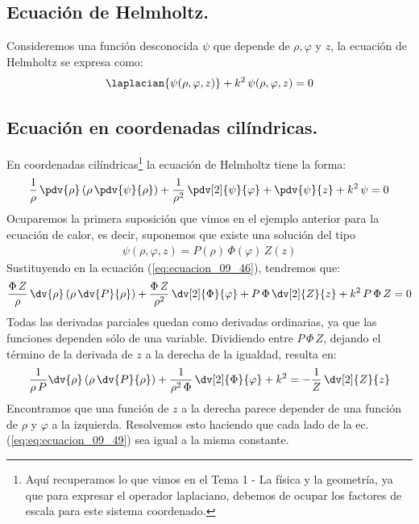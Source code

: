 \subsection{Ecuación de Helmholtz.}
Consideremos una función desconocida $\psi$ que depende de $\rho, \varphi$ y $z$, la ecuación de Helmholtz se expresa como:
\begin{align}
\laplacian{\psi (\rho, \varphi, z)} + k^{2} \, \psi (\rho, \varphi, z) = 0
\label{eq:ecuacion_09_45}    
\end{align}
\subsection{Ecuación en coordenadas cilíndricas.}
En coordenadas cilíndricas\footnote{Aquí recuperamos lo que vimos en el Tema 1 - La física y la geometría, ya que para expresar el operador laplaciano, debemos de ocupar los factores de escala para este sistema coordenado.} la ecuación de Helmholtz tiene la forma:
\begin{align}
\dfrac{1}{\rho} \, \pdv{\rho} \left( \rho \, \pdv{\psi}{\rho} \right) + \dfrac{1}{\rho^{2}} \, \pdv[2]{\psi}{\varphi} + \pdv{\psi}{z} + k^{2} \, \psi = 0
\label{eq:ecuacion_09_46}
\end{align}
Ocuparemos la primera suposición que vimos en el ejemplo anterior para la ecuación de calor, es decir, suponemos que existe una solución del tipo
\begin{align}
\psi (\rho, \varphi, z) = P(\rho) \, \Phi (\varphi) \, Z(z)
\label{eq:ecuacion_09_47}
\end{align}
Sustituyendo en la ecuación (\ref{eq:ecuacion_09_46}), tendremos que:
\begin{align}
\dfrac{\Phi \, Z}{\rho} \, \dv{\rho} \left( \rho \, \dv{P}{\rho} \right) + \dfrac{\Phi \, Z}{\rho^{2}} \, \dv[2]{\Phi}{\varphi} + P \, \Phi \, \dv[2]{Z}{z} + k^{2} \, P \, \Phi \, Z = 0 
\label{eq:ecuacion_09_48}    
\end{align}
Todas las derivadas parciales quedan como derivadas ordinarias, ya que las funciones dependen sólo de una variable. Dividiendo entre $P \, \Phi \, Z$, dejando el término de la derivada de $z$ a la derecha de la igualdad, resulta en:
\begin{align}
\dfrac{1}{\rho \, P} \dv{\rho} \left( \rho \, \dv{P}{\rho} \right) + \dfrac{1}{\rho^{2} \, \Phi} \, \dv[2]{\Phi}{\varphi} + k^{2} =  - \dfrac{1}{Z} \, \dv[2]{Z}{z}
\label{eq:eq:ecuacion_09_49}
\end{align}
Encontramos que una función de $z$ a la derecha parece depender de una función de $\rho$ y $\varphi$ a la izquierda. Resolvemos esto haciendo que cada lado de la ec. (\ref{eq:eq:ecuacion_09_49}) sea igual a la misma constante. 
